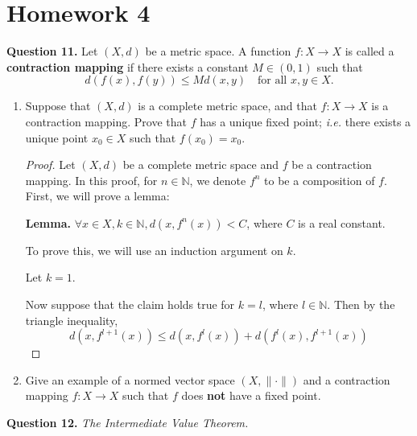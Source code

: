 \documentclass{article}
\theoremstyle{plain} %
\numberwithin{thm}{section} %
\theoremstyle{definition}
\begin{document}
    \setcounter{section}{3}
    \section{Homework 4}
    \noindent\textbf{Question 11.} Let $(X,d)$ be a metric space. A function $f:X\rightarrow X$ is called a \textbf{contraction mapping} if there exists a constant $M\in (0,1)$ such that
    \[ d(f(x),f(y))\leq M d(x,y) \quad \text{for all $x,y\in X$.} \]
    \begin{enumerate}[label=(\alph*)]
        \item Suppose that $(X,d)$ is a complete metric space, and that $f:X\rightarrow X$ is a contraction mapping. Prove that $f$ has a unique fixed point; \textit{i.e.} there exists a unique point $x_0\in X$ such that $f(x_0)=x_0$.
        
        \begin{proof}
            Let \((X, d)\) be a complete metric space and \(f\) be a contraction mapping. In this proof, for \(n \in \mathbb{N}\), we denote \(f^n\) to be a composition of \(f\). First, we will prove a lemma:

            \textbf{Lemma.} \(\forall x \in X, k \in \mathbb{N}, d(x, f^n(x)) < C\), where \(C\) is a real constant.

            To prove this, we will use an induction argument on \(k\).

            Let \(k=1\).

            Now suppose that the claim holds true for \(k=l\), where \(l \in \mathbb{N}\). Then by the triangle inequality,
            \[
                d(x, f^{l+1} (x)) \leq d(x, f^l (x)) + d(f^l(x), f^{l+1}(x))
            \]
        \end{proof}

        \item Give an example of a normed vector space $(X,\|\cdot\|)$ and a contraction mapping $f:X\rightarrow X$ such that $f$ does \textbf{not} have a fixed point.
    \end{enumerate}
    \noindent\textbf{Question 12.} \textit{The Intermediate Value Theorem.}
\end{document}
